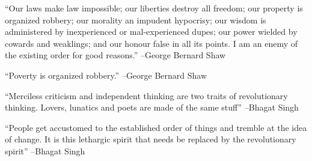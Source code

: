 \documentclass{article}%
\begin{document}
\vspace{1mm}%
\begin{minipage}{\textwidth}%
\flushleft%
“Our laws make law impossible; our liberties destroy all freedom; our property is organized robbery; our morality an impudent hypocrisy; our wisdom is administered by inexperienced or mal{-}experienced dupes; our power wielded by cowards and weaklings; and our honour false in all its points. I am an enemy of the existing order for good reasons.”%
\linebreak%
\vspace{1mm}%
–George Bernard Shaw%
\linebreak%
\vspace{1mm}%
\end{minipage}%
\linebreak%
\vspace{1mm}%
\begin{minipage}{\textwidth}%
\flushleft%
“Poverty is organized robbery.”%
\linebreak%
\vspace{1mm}%
–George Bernard Shaw%
\linebreak%
\vspace{1mm}%
\end{minipage}%
\linebreak%
\vspace{1mm}%
\begin{minipage}{\textwidth}%
\flushleft%
“Merciless criticism and independent thinking are two traits of revolutionary thinking. Lovers, lunatics and poets are made of the same stuff”%
\linebreak%
\vspace{1mm}%
–Bhagat Singh%
\linebreak%
\vspace{1mm}%
\end{minipage}%
\linebreak%
\vspace{1mm}%
\begin{minipage}{\textwidth}%
\flushleft%
“People get accustomed to the established order of things and tremble at the idea of change. It is this lethargic spirit that needs be replaced by the revolutionary spirit”%
\linebreak%
\vspace{1mm}%
–Bhagat Singh%
\linebreak%
\vspace{1mm}%
\end{minipage}%
\linebreak%
\vspace{1mm}%
\end{document}
